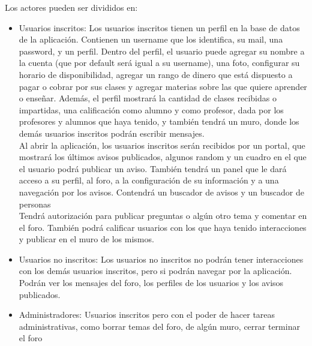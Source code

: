 \documentclass[12pt]{article}
\begin{document}
Los actores pueden ser divididos en:
\begin{itemize}
  \item{Usuarios inscritos: Los usuarios inscritos tienen un perfil en la base
  de datos de la aplicación. Contienen un username que los identifica, su mail,
  una password, y un perfil. Dentro del perfil, el usuario puede agregar su
  nombre a la cuenta (que por default será igual a su username), una foto,
  configurar su horario de disponibilidad, agregar un rango de dinero que está
  dispuesto a pagar o cobrar por sus clases y agregar materias sobre las que
  quiere aprender o enseñar. Además, el perfil mostrará la cantidad de clases
  recibidas o impartidas, una calificación como alumno y como profesor, dada por
  los profesores y alumnos que haya tenido, y también tendrá un muro, donde los
  demás usuarios inscritos podrán escribir mensajes.\\
  Al abrir la aplicación, los usuarios inscritos serán recibidos por un portal,
  que mostrará los últimos avisos publicados, algunos random y un cuadro en el
  que el usuario podrá publicar un aviso. También tendrá un panel que le dará
  acceso a su perfil, al foro, a la configuración de su información y a una
  navegación por los avisos. Contendrá un buscador de avisos y un buscador de
  personas\\
  Tendrá autorización para publicar preguntas o algún otro tema y comentar en el
  foro. También podrá calificar usuarios con los que haya tenido interacciones y
  publicar en el muro de los mismos.\\
  }
  \item{Usuarios no inscritos: Los usuarios no inscritos no podrán tener
  interacciones con los demás usuarios inscritos, pero si podrán navegar por la
  aplicación. Podrán ver los mensajes del foro, los perfiles de los usuarios y
  los avisos publicados.\\}
  \item{Administradores: Usuarios inscritos pero con el poder de hacer tareas
  administrativas, como borrar temas del foro, de algún muro, cerrar terminar el
  foro }

\end{itemize}

\end{document}
